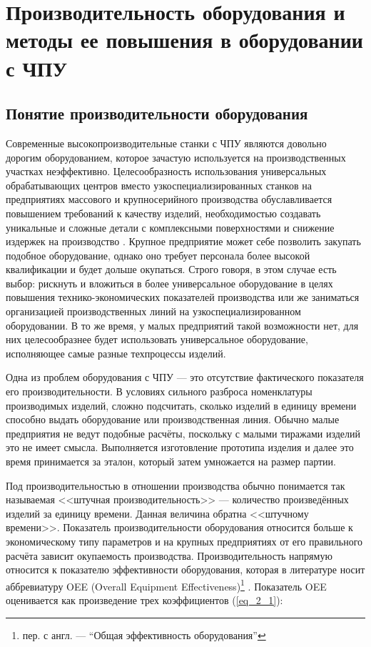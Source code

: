 \chapter{Производительность оборудования и методы ее повышения в оборудовании с ЧПУ} \label{chapt2}

\section{Понятие производительности оборудования} \label{sect2_1}

Современные высокопроизводительные станки с ЧПУ являются довольно дорогим оборудованием, которое зачастую используется на производственных участках неэффективно. Целесообразность использования универсальных обрабатывающих центров вместо узкоспециализированных станков на предприятиях массового и крупносерийного производства обуславливается повышением требований к качеству изделий, необходимостью создавать уникальные и сложные детали с комплексными поверхностями и снижение издержек на производство \cite{Molchanov}. Крупное предприятие может себе позволить закупать подобное оборудование, однако оно требует персонала более высокой квалификации и будет дольше окупаться. Строго говоря, в этом случае есть выбор: рискнуть и вложиться в более универсальное оборудование в целях повышения технико-экономических показателей производства или же заниматься организацией производственных линий на узкоспециализированном оборудовании. В то же время, у малых предприятий такой возможности нет, для них целесообразнее будет использовать универсальное оборудование, исполняющее самые разные техпроцессы изделий.

Одна из проблем оборудования с ЧПУ --- это отсутствие фактического показателя его производительности. В условиях сильного разброса номенклатуры производимых изделий, сложно подсчитать, сколько изделий в единицу времени способно выдать оборудование или производственная линия. Обычно малые предприятия не ведут подобные расчёты, поскольку с малыми тиражами изделий это не имеет смысла. Выполняется изготовление прототипа изделия и далее это время принимается за эталон, который затем умножается на размер партии.

Под производительностью в отношении производства обычно понимается так называемая <<штучная производительность>> --- количество произведённых изделий за единицу времени. Данная величина обратна <<штучному времени>>. Показатель производительности оборудования относится больше к экономическому типу параметров и на крупных предприятиях от его правильного расчёта зависит окупаемость производства. Производительность напрямую относится к показателю эффективности оборудования, которая в литературе носит аббревиатуру OEE (Overall Equipment Effectiveness)\footnote{пер. с англ. --- ``Общая эффективность оборудования''} \cite{Kennet}. Показатель OEE оценивается как произведение трех коэффициентов (\ref{eq_2_1}):

